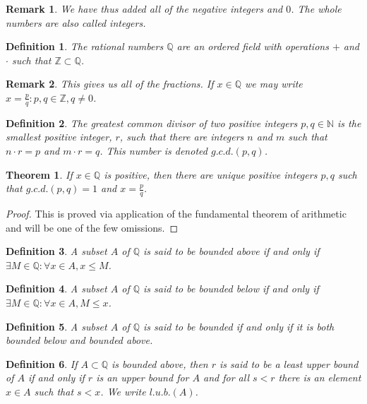 \documentclass[oneside]{book}
\theoremstyle{mystyle}
\newtheorem{theorem}{Theorem}[section]
\newtheorem{definition}{Definition}[section]
\newtheorem{remark}{Remark}[section]
\begin{document}
\begin{remark}
We have thus added all of the negative integers and $0$. The whole numbers are also called integers.
\end{remark}

\begin{definition}
The rational numbers $\mathbb{Q}$ are an ordered field with operations $+$ and $\cdot$ such that $\mathbb{Z}\subset \mathbb{Q}$.
\end{definition}

\begin{remark}
This gives us all of the fractions. If $x\in \mathbb{Q}$ we may write $x= \frac{p}{q}:p,q\in \mathbb{Z}, q\ne 0$.
\end{remark}

\begin{definition}
The greatest common divisor of two positive integers $p,q\in \mathbb{N}$ is the smallest positive integer, $r$, such that there are integers $n$ and $m$ such that $n\cdot r = p$ and $m\cdot r = q$. This number is denoted $g.c.d.(p,q)$.
\end{definition}

\begin{theorem}
If $x\in \mathbb{Q}$ is positive, then there are unique positive integers $p, q$ such that $g.c.d.(p,q)=1$ and $x=\frac{p}{q}$.
\end{theorem}
\begin{proof}
This is proved via application of the fundamental theorem of arithmetic and will be one of the few omissions.
\end{proof}

\begin{definition}
A subset $A$ of $\mathbb{Q}$ is said to be bounded above if and only if $\exists M\in \mathbb{Q}: \forall x\in A,x \leq M$.
\end{definition}

\begin{definition}
A subset $A$ of $\mathbb{Q}$ is said to be bounded below if and only if $\exists M\in \mathbb{Q}:\forall x\in A,M\leq x$. 
\end{definition}

\begin{definition}
A subset $A$ of $\mathbb{Q}$ is said to be bounded if and only if it is both bounded below and bounded above.
\end{definition}

\begin{definition}
If $A\subset \mathbb{Q}$ is bounded above, then $r$ is said to be a least upper bound of $A$ if and only if $r$ is an upper bound for $A$ and for all $s<r$ there is an element $x\in A$ such that $s<x$. We write $l.u.b.(A)$.
\end{definition}
\end{document}
